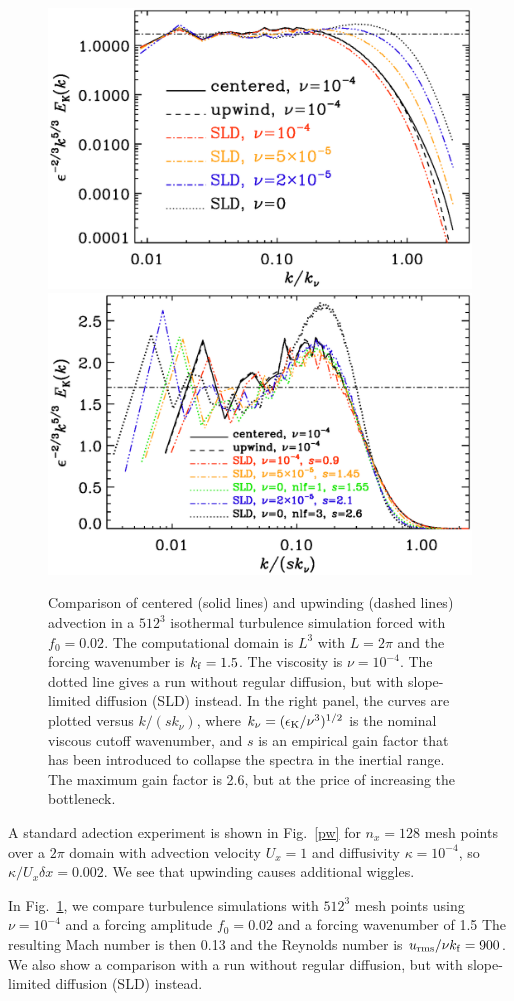 \documentclass[\mydriver,12pt,twoside,notitlepage,a4paper]{article}
\begin{document}
\begin{figure}[h!]\begin{center}
\includegraphics[width=.49\columnwidth]{pspec-comp}
\includegraphics[width=.49\columnwidth]{pspec-comp-lin}
\end{center}\caption[]{
  Comparison of centered (solid lines) and upwinding (dashed lines)
  advection in a $512^3$ isothermal turbulence simulation forced with
  $f_0=0.02$.
  The computational domain is $L^3$ with $L=2\pi$ and the forcing
  wavenumber is $k_{\rm f}=1.5$.
  The viscosity is $\nu=10^{-4}$.
  The dotted line gives a run without regular diffusion, but
  with slope-limited diffusion (SLD) instead.
  In the right panel, the curves are plotted versus $k/(sk_\nu)$, where
  $k_\nu=(\epsilon_{\rm K}/\nu^3)^{1/2}$ is the nominal viscous cutoff
  wavenumber, and $s$ is an empirical gain factor that has been introduced
  to collapse the spectra in the inertial range.
  The maximum gain factor is 2.6, but at the price of increasing
  the bottleneck.
}\label{pspec}\end{figure}

A standard adection experiment is shown in Fig.~\ref{pw}
for $n_x=128$ mesh points over a $2\pi$ domain with
advection velocity $U_x=1$ and diffusivity $\kappa=10^{-4}$,
so $\kappa/U_x\delta x=0.002$.
We see that upwinding causes additional wiggles.

In Fig.~\ref{pspec}, we compare turbulence simulations with $512^3$
mesh points using $\nu=10^{-4}$ and a forcing amplitude $f_0=0.02$
and a forcing wavenumber of 1.5
The resulting Mach number is then 0.13 and the Reynolds number
is $u_{\rm rms}/\nu k_{\rm f}=900$.
We also show a comparison with a run without regular diffusion, but
with slope-limited diffusion (SLD) instead.
\end{document}
